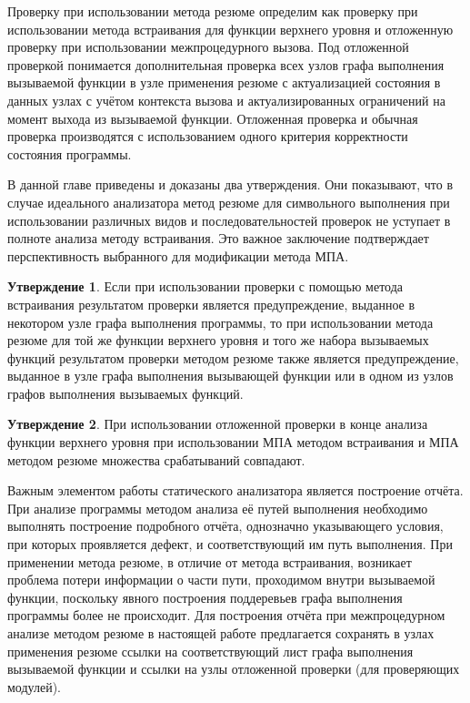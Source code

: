Проверку при использовании метода резюме определим как проверку при использовании метода встраивания для функции верхнего уровня и отложенную проверку при использовании межпроцедурного вызова. Под отложенной проверкой понимается дополнительная проверка всех узлов графа выполнения вызываемой функции в узле применения резюме с актуализацией состояния в данных узлах с учётом контекста вызова и актуализированных ограничений на момент выхода из вызываемой функции. Отложенная проверка и обычная проверка производятся с использованием одного критерия корректности состояния программы.

В данной главе приведены и доказаны два утверждения. Они показывают, что в случае идеального анализатора метод резюме для символьного выполнения при использовании различных видов и последовательностей проверок не уступает в полноте анализа методу встраивания. Это важное заключение подтверждает перспективность выбранного для модификации метода МПА.

\textbf{Утверждение 1}. Если при использовании проверки с помощью метода встраивания результатом проверки является предупреждение, выданное в некотором узле графа выполнения программы, то при использовании метода резюме для той же функции верхнего уровня и того же набора вызываемых функций результатом проверки методом резюме также является предупреждение, выданное в узле графа выполнения вызывающей функции или в одном из узлов графов выполнения вызываемых функций.

\textbf{Утверждение 2}. При использовании отложенной проверки в конце анализа функции верхнего уровня при использовании МПА методом встраивания и МПА методом резюме множества срабатываний совпадают.

Важным элементом работы статического анализатора является построение отчёта. При анализе программы методом анализа её путей выполнения необходимо выполнять построение подробного отчёта, однозначно указывающего условия, при которых проявляется дефект, и соответствующий им путь выполнения. При применении метода резюме, в отличие от метода встраивания, возникает проблема потери информации о части пути, проходимом внутри вызываемой функции, поскольку явного построения поддеревьев графа выполнения программы более не происходит. Для построения отчёта  при межпроцедурном анализе методом резюме в настоящей работе предлагается сохранять в узлах применения резюме ссылки на соответствующий лист графа выполнения вызываемой функции и ссылки на узлы отложенной проверки (для проверяющих модулей).

